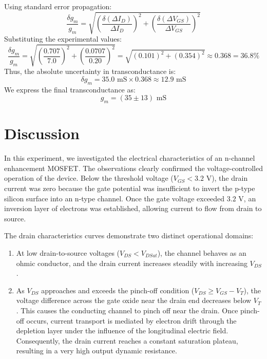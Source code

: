 \documentclass[12pt,a4paper]{article}
\begin{document}
Using standard error propagation:
\begin{equation}
    \frac{\delta g_m}{g_m} = \sqrt{\left(\frac{\delta(\Delta I_D)}{\Delta I_D}\right)^2 + \left(\frac{\delta(\Delta V_{GS})}{\Delta V_{GS}}\right)^2}
\end{equation}
Substituting the experimental values:
\begin{equation}
    \frac{\delta g_m}{g_m} = \sqrt{\left(\frac{0.707}{7.0}\right)^2 + \left(\frac{0.0707}{0.20}\right)^2} = \sqrt{(0.101)^2 + (0.354)^2} \approx 0.368 = 36.8\%
\end{equation}
Thus, the absolute uncertainty in transconductance is:
\begin{equation}
    \delta g_m = 35.0\text{ mS} \times 0.368 \approx 12.9\text{ mS}
\end{equation}
We express the final transconductance as:
\begin{equation*}
    g_m = (35 \pm 13)\text{ mS}
\end{equation*}

\section{Discussion}
In this experiment, we investigated the electrical characteristics of an n-channel enhancement MOSFET. The observations clearly confirmed the voltage-controlled operation of the device. Below the threshold voltage ($V_{GS} < 3.2\text{ V}$), the drain current was zero because the gate potential was insufficient to invert the p-type silicon surface into an n-type channel. Once the gate voltage exceeded $3.2\text{ V}$, an inversion layer of electrons was established, allowing current to flow from drain to source.

The drain characteristics curves demonstrate two distinct operational domains:
\begin{enumerate}
    \item At low drain-to-source voltages ($V_{DS} < V_{DSat}$), the channel behaves as an ohmic conductor, and the drain current increases steadily with increasing $V_{DS}$.
    \item As $V_{DS}$ approaches and exceeds the pinch-off condition ($V_{DS} \ge V_{GS} - V_T$), the voltage difference across the gate oxide near the drain end decreases below $V_T$. This causes the conducting channel to pinch off near the drain. Once pinch-off occurs, current transport is mediated by electron drift through the depletion layer under the influence of the longitudinal electric field. Consequently, the drain current reaches a constant saturation plateau, resulting in a very high output dynamic resistance.
\end{enumerate}
\end{document}
